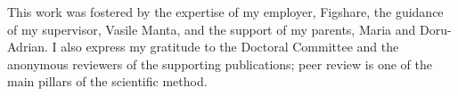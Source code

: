 \thispagestyle{empty}
This work was fostered by the expertise of my employer, Figshare, the guidance of my supervisor, Vasile Manta, and the support of my parents, Maria and Doru-Adrian. I also express my gratitude to the Doctoral Committee and the anonymous reviewers of the supporting publications; peer review is one of the main pillars of the scientific method.